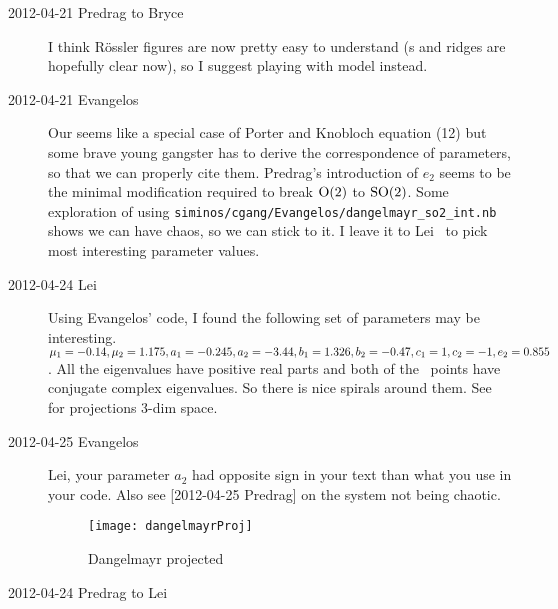 \begin{description}
\item[2012-04-21 Predrag to Bryce] I think R\"ossler figures are now
pretty easy to understand (\poincBord s and ridges are hopefully clear
now), so I suggest playing with {\twoMode} model instead.

\item[2012-04-21 Evangelos] Our  seems like a special case of
Porter and Knobloch equation (12) but some brave young gangster
has to derive the correspondence of parameters, so that we can properly cite
them. Predrag's introduction of $e_2$
seems to be the minimal modification required to break $\textrm{O}(2)$ to $\textrm{SO}(2)$.
Some exploration of 
using \texttt{siminos/cgang/Evangelos/dangelmayr\_so2\_int.nb}
shows we can have chaos, so we can stick to it. I leave it to Lei \etal\
to pick most interesting parameter values.

\item[2012-04-24 Lei] Using Evangelos' code, I found the following set of
parameters may be interesting. $\mu_1=-0.14,\mu_2=1.175,
a_1=-0.245,a_2=-3.44, b_1=1.326, b_2=-0.47, c_1=1, c_2=-1, e_2=0.855$. All
the eigenvalues have positive real parts and both of the \eqv\
points have conjugate complex eigenvalues. So there is nice spirals
around them. See \reffig{fig:dangelmayr_proj} for projections
3-dim space.

\item[2012-04-25 Evangelos] Lei, your parameter $a_2$ had opposite sign in your text
than what you use in your code. Also see [2012-04-25 Predrag] on the system not being
chaotic.

\begin{figure}
\centering
\texttt{[image: dangelmayrProj]}
\caption{Dangelmayr projected}
\label{fig:dangelmayr_proj}
\end{figure}

\item[2012-04-24 Predrag to Lei]


\end{description}
